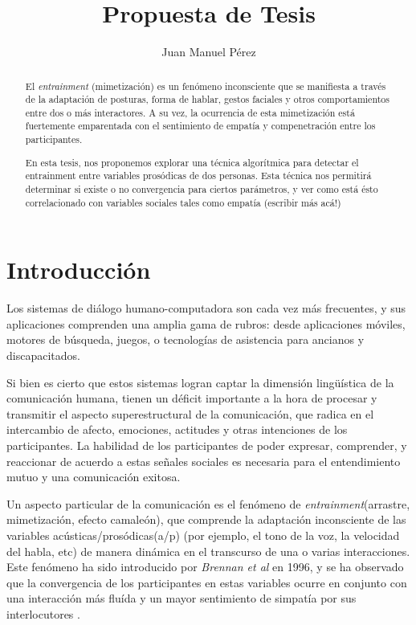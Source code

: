 \documentclass[a4paper,11pt]{article}
\title{Propuesta de Tesis}
\author{Juan Manuel Pérez}
\begin{document}
\maketitle

\begin{abstract}

El \emph{entrainment} (mimetización) es un fenómeno inconsciente que se manifiesta a través de la adaptación de posturas, forma de hablar, gestos faciales y otros comportamientos entre dos o más interactores. A su vez, la ocurrencia de esta mimetización está fuertemente emparentada con el sentimiento de empatía y compenetración entre los participantes.

En esta tesis, nos proponemos explorar una técnica algorítmica para detectar el entrainment entre variables prosódicas de dos personas. Esta técnica nos permitirá determinar si existe o no convergencia para ciertos parámetros, y ver como está ésto correlacionado con variables sociales tales como empatía (escribir más acá!)


\end{abstract}


\section*{Introducción}

Los sistemas de diálogo humano-computadora son cada vez más frecuentes, y sus aplicaciones comprenden una amplia gama de rubros: desde aplicaciones móviles, motores de búsqueda, juegos, o tecnologías de asistencia para ancianos y discapacitados.

Si bien es cierto que estos sistemas logran captar la dimensión lingüística de la comunicación humana, tienen un déficit importante a la hora de procesar y transmitir el aspecto superestructural de la comunicación, que radica en el intercambio de afecto, emociones, actitudes y otras intenciones de los participantes. La habilidad de los participantes de poder expresar, comprender, y reaccionar de acuerdo a estas señales sociales es necesaria para el entendimiento mutuo y una comunicación exitosa.

Un aspecto particular de la comunicación es el fenómeno de \emph{entrainment}(arrastre, mimetización, efecto camaleón), que comprende la adaptación inconsciente de las variables acústicas/prosódicas(a/p) (por ejemplo, el tono de la voz, la velocidad del habla, etc) de manera dinámica en el transcurso de una o varias interacciones. Este fenómeno ha sido introducido por \emph{Brennan et al}\cite{BRE1996} en 1996, y se ha observado que la convergencia de los participantes en estas variables ocurre en conjunto con una interacción más fluída y un mayor sentimiento de simpatía por sus interlocutores \cite{CHAR1999}.
\end{document}
